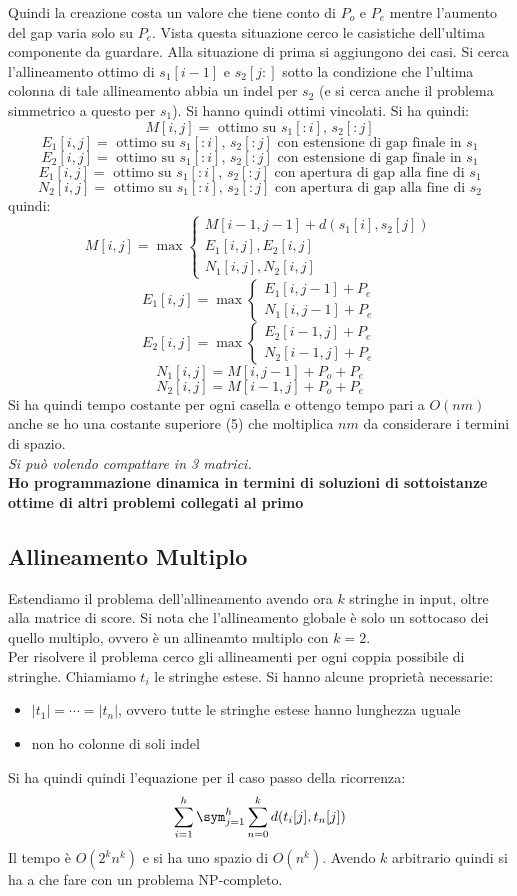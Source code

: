 \documentclass[a4paper,12pt, oneside]{book}
\begin{document}
Quindi la creazione costa un valore che tiene conto di $P_o$ e $P_e$
mentre l'aumento del gap varia solo su $P_e$. Vista questa situazione
cerco le casistiche dell'ultima componente da guardare. Alla
situazione di prima si aggiungono dei casi. Si cerca l'allineamento
ottimo di $s_1[i-1]$ e $s_2[j:]$ sotto la condizione che l'ultima
colonna di tale allineamento abbia un indel per $s_2$ (e si cerca
anche il problema simmetrico a questo per $s_1$). Si hanno quindi
ottimi vincolati.
\newpage
Si ha quindi: 
\[M[i,j]=\mbox{ ottimo su } s_1[:i],\,s_2[:j]\]
\[E_1[i,j]=\mbox{ ottimo su } s_1[:i],\,s_2[:j] \mbox{ con estensione
    di gap finale in }s_1\]
\[E_2[i,j]=\mbox{ ottimo su } s_1[:i],\,s_2[:j] \mbox{ con estensione
    di gap finale in }s_1\]
\[E_1[i,j]=\mbox{ ottimo su } s_1[:i],\,s_2[:j] \mbox{ con apertura
    di gap alla fine di }s_1\]
\[N_2[i,j]=\mbox{ ottimo su } s_1[:i],\,s_2[:j] \mbox{  con apertura
    di gap alla fine di }s_2\]
quindi:
\[M[i,j]=\max
  \begin{cases}
    M[i-1,j-1]+d(s_1[i],s_2[j])\\
    E_1[i,j],E_2[i,j]\\
    N_1[i,j],N_2[i,j]
  \end{cases}
\]
\[E_1[i,j]=\max
  \begin{cases}
    E_1[i,j-1]+P_e\\
    N_1[i,j-1]+P_e
  \end{cases}
\]
\[E_2[i,j]=\max
  \begin{cases}
    E_2[i-1,j]+P_e\\
    N_2[i-1,j]+P_e
  \end{cases}
\]
\[N_1[i,j]=M[i,j-1]+P_o+P_e\]
\[N_2[i,j]=M[i-1,j]+P_o+P_e\]
Si ha quindi tempo costante per ogni casella e ottengo tempo pari a
$O(nm)$ anche se ho una costante superiore (5) che moltiplica $nm$ da
considerare i termini di spazio.\\
\textit{Si può volendo compattare in 3 matrici.}\\
\textbf{Ho programmazione dinamica in termini di soluzioni di
  sottoistanze ottime di altri problemi collegati al primo}\\
\subsection{Allineamento Multiplo}
Estendiamo il problema dell'allineamento avendo ora $k$ stringhe in
input, oltre alla matrice di score. Si nota che l'allineamento globale
è solo un sottocaso dei quello multiplo, ovvero è un allineamto
multiplo con $k=2$.\\
Per risolvere il problema cerco gli allineamenti per ogni coppia
possibile di stringhe. Chiamiamo $t_i$ le stringhe estese. Si hanno
alcune proprietà necessarie:
\begin{itemize}
  \item $|t_1|=\cdots=|t_n|$, ovvero tutte le stringhe estese hanno
  lunghezza uguale
  \item non ho colonne di soli indel
\end{itemize}
Si ha quindi quindi l'equazione per il caso passo della ricorrenza:
\[\sum_{i=1}^h\sym_{j=1}^h\sum_{n=0}^kd(t_i[j], t_n[j])\]
Il tempo è $O(2^kn^k)$ e si ha uno spazio di $O(n^k)$. Avendo $k$
arbitrario quindi si ha a che fare con un problema NP-completo.
\end{document}
